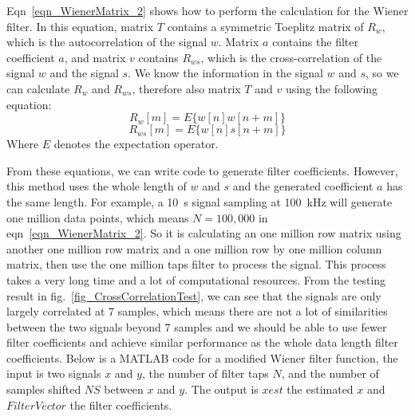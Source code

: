 Eqn~\ref{eqn_WienerMatrix_2} shows how to perform the calculation for the Wiener filter.  In this equation, matrix $T$ contains a symmetric Toeplitz matrix of $R_w$, which is the autocorrelation of the signal $w$.  Matrix $a$ contains the filter coefficient $a$, and matrix $v$ contains $R_{ws}$, which is the cross-correlation of the signal $w$ and the signal $s$.  We know the information in the signal $w$ and $s$, so we can calculate $R_w$ and $R_{ws}$, therefore also matrix $T$ and $v$ using the following equation:
$$R_w[m]=E\{w[n]w[n+m]\}$$
$$R_{ws}[m]=E\{w[n]s[n+m]\}$$
Where $E$ denotes the expectation operator.

From these equations, we can write code to generate filter coefficients.  However, this method uses the whole length of $w$ and $s$ and the generated coefficient $a$ has the same length.  For example, a \qty{10}{s} signal sampling at \qty{100}{kHz} will generate one million data points, which means $N=100,000$ in eqn~\ref{eqn_WienerMatrix_2}.  So it is calculating an one million row matrix using another one million row matrix and a one million row by one million column matrix, then use the one million taps filter to process the signal.  This process takes a very long time and a lot of computational resources.  From the testing result in fig.~\ref{fig_CrossCorrelationTest}, we can see that the signals are only largely correlated at 7 samples, which means there are not a lot of similarities between the two signals beyond 7 samples and we should be able to use fewer filter coefficients and achieve similar performance as the whole data length filter coefficients.  Below is a MATLAB code for a modified Wiener filter function, the input is two signals $x$ and $y$, the number of filter taps $N$, and the number of samples shifted $NS$ between $x$ and $y$.  The output is $xest$ the estimated $x$ and $FilterVector$ the filter coefficients.


